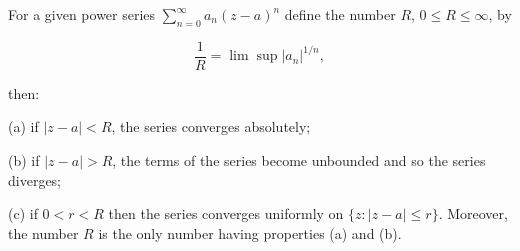 For a given power series $\sum_{n=0}^{\infty} a_n(z-a)^n$ define the number $R$, $0 \leq R \leq \infty$, by

$$\frac{1}{R} = \lim \sup |a_n|^{1/n},$$

then:

(a) if $|z-a| < R$, the series converges absolutely;

(b) if $|z-a| > R$, the terms of the series become unbounded and so the series diverges;

(c) if $0 < r < R$ then the series converges uniformly on $\{z: |z-a| \leq r\}$. Moreover, the number $R$ is the only number having properties (a) and (b).